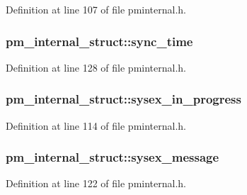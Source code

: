 Definition at line 107 of file pminternal.\+h.

\subsubsection[{\texorpdfstring{sync\+\_\+time}{sync_time}}]{ pm\+\_\+internal\+\_\+struct\+::sync\+\_\+time}\hypertarget{structpm__internal__struct_a44a7aab14a2defa36ecb73143d541aa6}{}\label{structpm__internal__struct_a44a7aab14a2defa36ecb73143d541aa6}


Definition at line 128 of file pminternal.\+h.

\subsubsection[{\texorpdfstring{sysex\+\_\+in\+\_\+progress}{sysex_in_progress}}]{ pm\+\_\+internal\+\_\+struct\+::sysex\+\_\+in\+\_\+progress}\hypertarget{structpm__internal__struct_abf9a68e60ff9e12d776af6807aa1467a}{}\label{structpm__internal__struct_abf9a68e60ff9e12d776af6807aa1467a}


Definition at line 114 of file pminternal.\+h.

\subsubsection[{\texorpdfstring{sysex\+\_\+message}{sysex_message}}]{ pm\+\_\+internal\+\_\+struct\+::sysex\+\_\+message}\hypertarget{structpm__internal__struct_a020e2d32d420628c81216a2be3d03d3c}{}\label{structpm__internal__struct_a020e2d32d420628c81216a2be3d03d3c}


Definition at line 122 of file pminternal.\+h.

